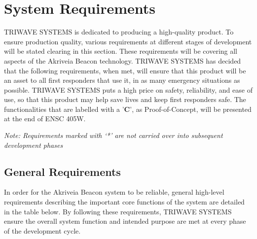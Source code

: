 

\setcounter{section}{2}
\section{System Requirements}
\bigskip
TRIWAVE SYSTEMS is dedicated to producing a high-quality product. To ensure production quality, various requirements at different stages of development will be stated clearing in this section. These requirements will be covering all aspects of the Akriveia Beacon technology. TRIWAVE SYSTEMS has decided that the following requirements, when met, will ensure that this product will be an asset to all first responders that use it, in as many emergency situations as possible. TRIWAVE SYSTEMS puts a high price on safety, reliability, and ease of use, so that this product may help save lives and keep first responders safe.  The functionalities that are labelled with a '\textbf{C}', as Proof-of-Concept, will be presented at the end of ENSC 405W.

\bigskip
\textit{Note: Requirements marked with ‘*’ are not carried over into subsequent development phases}


\bigskip
\subsection{General Requirements}
In order for the Akriveia Beacon system to be reliable, general high-level requirements describing the important core functions of the system are detailed in the table below. By following these requirements, TRIWAVE SYSTEMS ensure the overall system function and intended purpose are met at every phase of the development cycle.

\bigskip

